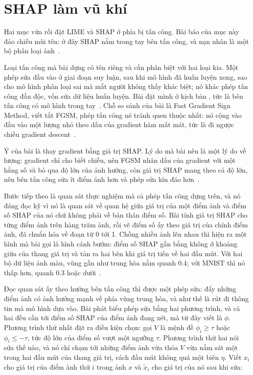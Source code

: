 \section{SHAP làm vũ khí}
\label{sec:ch14-shap-lam-vu-khi}

%
Hai mục vừa rồi đặt LIME và SHAP ở phía bị tấn công. Bài báo của mục này đảo
chiều mũi tên: ở đây SHAP nằm trong tay bên tấn công, và nạn nhân là một bộ
phân loại ảnh~\autocite{p28shapattack}.

%
Loại tấn công mà bài dựng có tên riêng và cần phân biệt với hai loại kia. Một
phép  sửa đầu vào ở giai đoạn suy luận,
sau khi mô hình đã huấn luyện xong, sao cho mô hình phân loại sai mà mắt người
không thấy khác biệt; nó khác phép tấn công đầu độc, vốn sửa dữ liệu huấn
luyện. Bài đặt mình ở kịch bản , tức là bên tấn công
có mô hình trong tay~\autocite{p28shapattack}. Chỗ so sánh của bài là Fast
Gradient Sign Method, viết tắt FGSM, phép tấn công né tránh quen thuộc nhất: nó
cộng vào đầu vào một lượng nhỏ theo dấu của gradient hàm mất mát, tức là đi
ngược chiều gradient descent~\autocite{p28shapattack}.

Ý của bài là thay gradient bằng giá trị SHAP. Lý do mà bài nêu là một lý do về
lượng: gradient chỉ cho biết chiều, nên FGSM nhân dấu của gradient với một hằng
số và bỏ qua độ lớn của ảnh hưởng, còn giá trị SHAP mang theo cả độ lớn, nên
bên tấn công sửa ít điểm ảnh hơn và phép sửa kín đáo
hơn~\autocite{p28shapattack}.

%
Bước tiếp theo là quan sát thực nghiệm mà cả phép tấn công dựng trên, và nó
đáng đọc kỹ vì nó là quan sát về quan hệ giữa giá trị của một điểm ảnh và điểm
số SHAP của nó chứ không phải về bản thân điểm số. Bài tính giá trị SHAP cho
từng điểm ảnh trên hàng trăm ảnh, rồi vẽ điểm số ấy theo giá trị của chính điểm
ảnh, đã chuẩn hóa về đoạn từ 0 tới 1. Chồng nhiều ảnh lên nhau thì hiện ra một
hình mà bài gọi là hình cánh bướm: điểm số SHAP gần bằng không ở khoảng giữa
của thang giá trị và tản ra hai bên khi giá trị tiến về hai đầu mút. Với hai bộ
dữ liệu ảnh màu, vùng gần như trung hòa nằm quanh 0.4; với MNIST thì nó thấp
hơn, quanh 0.3 hoặc dưới~\autocite{p28shapattack}.

Đọc quan sát ấy theo hướng bên tấn công thì được một phép sửa: đẩy những điểm
ảnh có ảnh hưởng mạnh về phía vùng trung hòa, và như thế là rút đi thông tin mà
mô hình dựa vào. Bài phát biểu phép sửa bằng hai phương trình, và cả hai đều
cần tới điểm số SHAP của điểm ảnh đang xét, mà từ đây viết là $\phi$. Phương
trình thứ nhất đặt ra điều kiện chọn: gọi $V$ là mệnh đề $\phi_i \ge \tau$ hoặc
$\phi_i \le -\tau$, tức độ lớn của điểm số vượt một ngưỡng $\tau$. Phương trình
thứ hai nói sửa thế nào, và nó chỉ chạm tới những điểm ảnh vừa thỏa $V$ vừa nằm
sát một trong hai đầu mút của thang giá trị, cách đầu mút không quá một biên
$\eta$. Viết $x_i$ cho giá trị của điểm ảnh thứ $i$ trong ảnh $x$ và
$\tilde{x}_i$ cho giá trị của nó sau khi sửa:

